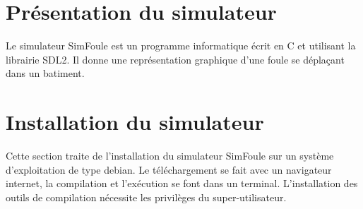 
%

\section{Présentation du simulateur}
%
Le simulateur SimFoule est un programme informatique écrit en C et utilisant la librairie SDL2. Il donne une représentation graphique d'une foule se déplaçant dans un batiment.
%
%
\section{Installation du simulateur}
Cette section traite de l'installation du simulateur SimFoule sur un système d'exploitation de type debian. Le téléchargement se fait avec un navigateur internet, la compilation et l'exécution se font dans un terminal. L'installation des outils de compilation nécessite les privilèges du super-utilisateur.

